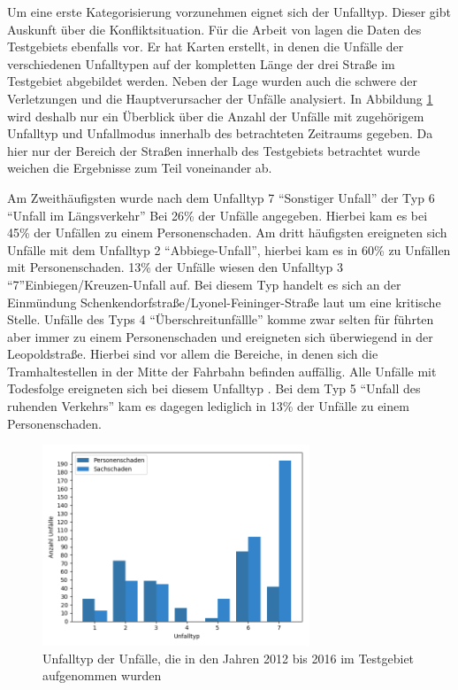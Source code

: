 Um eine erste Kategorisierung vorzunehmen eignet sich der Unfalltyp. Dieser gibt Auskunft über die Konfliktsituation. Für die Arbeit von \Textcite[S.16-33]{Bruhn.2018} lagen die Daten des Testgebiets ebenfalls vor. Er hat Karten erstellt, in denen die Unfälle der verschiedenen Unfalltypen auf der kompletten Länge der drei Straße im Testgebiet abgebildet werden. Neben der Lage wurden auch die schwere der Verletzungen und die Hauptverursacher der Unfälle analysiert. In Abbildung \ref{fig:Unfalltyp} wird deshalb nur ein Überblick über die  Anzahl der Unfälle mit zugehörigem Unfalltyp und Unfallmodus innerhalb des betrachteten Zeitraums gegeben. Da hier nur der Bereich der Straßen innerhalb des Testgebiets betrachtet wurde weichen die Ergebnisse zum Teil voneinander ab. 

Am Zweithäufigsten wurde nach dem Unfalltyp 7 \enquote{Sonstiger Unfall} der Typ 6 \enquote{Unfall im Längsverkehr} Bei 26\% der Unfälle angegeben. Hierbei kam es bei 45\% der Unfällen zu einem Personenschaden. Am dritt häufigsten ereigneten sich Unfälle mit dem Unfalltyp 2 \enquote{Abbiege-Unfall}, hierbei kam es in 60\% zu Unfällen mit Personenschaden. 13\% der Unfälle wiesen den Unfalltyp 3 \enquote7Einbiegen/Kreuzen-Unfall auf. Bei diesem Typ handelt es sich an der Einmündung Schenkendorfstraße/Lyonel-Feininger-Straße laut \Textcite[S.23]{Bruhn.2018} um eine kritische Stelle. Unfälle des Typs 4 \enquote{Überschreitunfällle} komme zwar selten für führten aber immer zu einem Personenschaden und ereigneten sich überwiegend in der Leopoldstraße. Hierbei sind vor allem die Bereiche, in denen sich die Tramhaltestellen in der Mitte der Fahrbahn befinden auffällig. Alle Unfälle mit Todesfolge ereigneten sich bei diesem Unfalltyp \parencite[S.26-27]{Bruhn.2018}. Bei dem Typ 5 \enquote{Unfall des ruhenden Verkehrs} kam es dagegen lediglich in 13\% der Unfälle zu einem Personenschaden.

\begin{savenotes}
	\begin{figure}[H]
		\centering
		\includegraphics[width=8cm,height=6cm]{figures/Unfalltyp}
		\caption[Unfalltyp der Unfälle, die in den Jahren 2012 bis 2016 im Testgebiet aufgenommen wurden]{Unfalltyp der Unfälle, die in den Jahren 2012 bis 2016 im Testgebiet aufgenommen wurden}\label{fig:Unfalltyp}
	\end{figure}
\end{savenotes}

